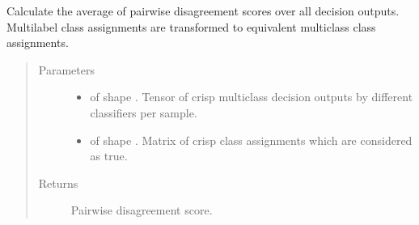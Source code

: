 \documentclass[letterpaper,10pt,english]{sphinxmanual}
\begin{document}
\begin{fulllineitems}
\label{\detokenize{pusion.evaluation.evaluation_metrics:pusion.evaluation.evaluation_metrics.pairwise_disagreement}}
\sphinxAtStartPar
Calculate the average of pairwise disagreement scores over all decision outputs.
Multilabel class assignments are transformed to equivalent multiclass class assignments.
\begin{quote}\begin{description}
\item[{Parameters}] \leavevmode\begin{itemize}
\item {} 
\sphinxAtStartPar
{} \textendash{}  of shape .
Tensor of crisp multiclass decision outputs by different classifiers per sample.

\item {} 
\sphinxAtStartPar
{} \textendash{}  of shape .
Matrix of crisp class assignments which are considered as true.

\end{itemize}

\item[{Returns}] \leavevmode
\sphinxAtStartPar
Pairwise disagreement score.

\end{description}\end{quote}

\end{fulllineitems}

\end{document}
